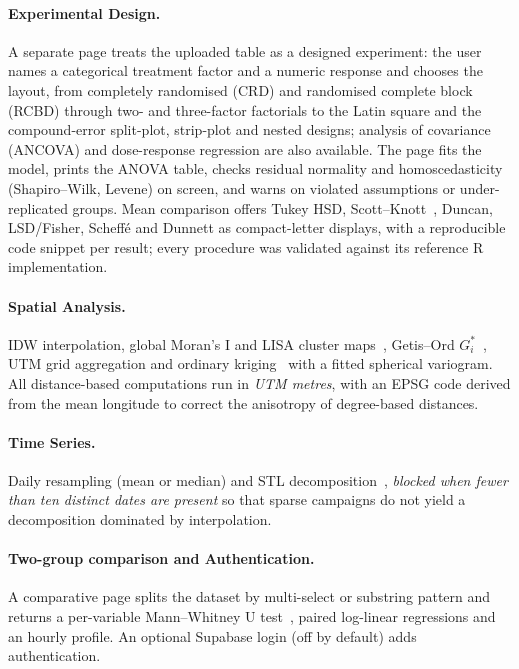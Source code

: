 \documentclass[11pt, letterpaper]{article}
\begin{document}
\paragraph{Experimental Design.} A separate page treats the uploaded table as a designed experiment: the user names a categorical treatment factor and a numeric response and chooses the layout, from completely randomised (CRD) and randomised complete block (RCBD) through two- and three-factor factorials to the Latin square and the compound-error split-plot, strip-plot and nested designs; analysis of covariance (ANCOVA) and dose-response regression are also available. The page fits the model, prints the ANOVA table, checks residual normality and homoscedasticity (Shapiro--Wilk, Levene) on screen, and warns on violated assumptions or under-replicated groups. Mean comparison offers Tukey HSD, Scott--Knott~\cite{ScottKnott1974}, Duncan, LSD/Fisher, Scheff\'e and Dunnett as compact-letter displays, with a reproducible code snippet per result; every procedure was validated against its reference R implementation.

\paragraph{Spatial Analysis.} IDW interpolation, global Moran's I and LISA cluster maps~\cite{Anselin1995}, Getis--Ord $G_i^*$~\cite{Getis1992}, UTM grid aggregation and ordinary kriging~\cite{Cressie1993} with a fitted spherical variogram. All distance-based computations run in \emph{UTM metres}, with an EPSG code derived from the mean longitude to correct the anisotropy of degree-based distances.

\paragraph{Time Series.} Daily resampling (mean or median) and STL decomposition~\cite{Cleveland1990STL}, \emph{blocked when fewer than ten distinct dates are present} so that sparse campaigns do not yield a decomposition dominated by interpolation.

\paragraph{Two-group comparison and Authentication.} A comparative page splits the dataset by multi-select or substring pattern and returns a per-variable Mann--Whitney U test~\cite{Mann1947}, paired log-linear regressions and an hourly profile. An optional Supabase login (off by default) adds authentication.
\end{document}

